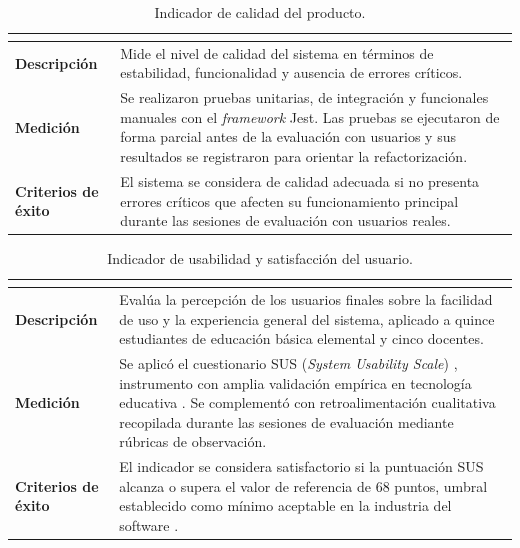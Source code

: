 \begin{table}[H]
\centering
\caption{Indicador de calidad del producto.}
\label{tab:ind_calidad}
\footnotesize
\renewcommand{\arraystretch}{1.25}
\begin{tabularx}{\textwidth}{|>{\bfseries}p{3.2cm}|X|}
\hline
\rowcolor{headblue}\multicolumn{2}{|c|}{\textbf{Calidad del sistema}}\\\hline
Descripción & Mide el nivel de calidad del sistema en términos de estabilidad, funcionalidad y ausencia de errores críticos. \\\hline
Medición & Se realizaron pruebas unitarias, de integración y funcionales manuales con el \textit{framework} Jest. Las pruebas se ejecutaron de forma parcial antes de la evaluación con usuarios y sus resultados se registraron para orientar la refactorización. \\\hline
Criterios de éxito & El sistema se considera de calidad adecuada si no presenta errores críticos que afecten su funcionamiento principal durante las sesiones de evaluación con usuarios reales. \\\hline
\end{tabularx}
\end{table}
\fuenteautor

\begin{table}[H]
\centering
\caption{Indicador de usabilidad y satisfacción del usuario.}
\label{tab:ind_sus}
\footnotesize
\renewcommand{\arraystretch}{1.25}
\begin{tabularx}{\textwidth}{|>{\bfseries}p{3.2cm}|X|}
\hline
\rowcolor{headblue}\multicolumn{2}{|c|}{\textbf{Nivel de satisfacción del usuario}}\\\hline
Descripción & Evalúa la percepción de los usuarios finales sobre la facilidad de uso y la experiencia general del sistema, aplicado a quince estudiantes de educación básica elemental y cinco docentes. \\\hline
Medición & Se aplicó el cuestionario SUS (\textit{System Usability Scale}) \cite{brooke1996sus}, instrumento con amplia validación empírica en tecnología educativa \cite{vlachogianni2022sus}. Se complementó con retroalimentación cualitativa recopilada durante las sesiones de evaluación mediante rúbricas de observación. \\\hline
Criterios de éxito & El indicador se considera satisfactorio si la puntuación SUS alcanza o supera el valor de referencia de 68 puntos, umbral establecido como mínimo aceptable en la industria del software \cite{brooke1996sus}. \\\hline
\end{tabularx}
\end{table}
\fuenteautor

